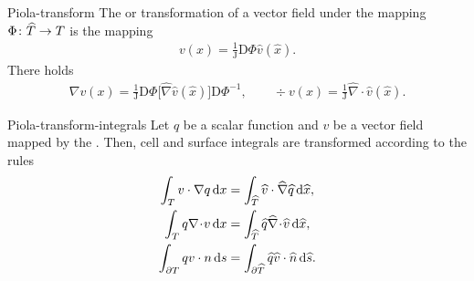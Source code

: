\begin{Definition}{Piola-transform}
  The  or 
    transformation of a vector field under the mapping
  $\Phi\colon\widehat {T}\to T$ is the mapping
  \begin{gather}
    v(x) = \tfrac1{\mathrm J} \mathrm D\Phi \widehat v(\widehat x).
  \end{gather}
  There holds
  \begin{gather}
    \nabla v(x) = \tfrac1{\mathrm J} \mathrm D\Phi
    \bigl[\widehat\nabla \widehat v(\widehat x)\bigr] \mathrm D\Phi^{-1},
    \qquad
    \div v(x) = \tfrac1{\mathrm J} \widehat\nabla\!\cdot\!
    \widehat v(\widehat x).
  \end{gather}
\end{Definition}

\begin{Lemma}{Piola-transform-integrals}
  Let $q$ be a scalar function and $v$ be a 
  vector field mapped by the . Then, cell
  and surface integrals are transformed according to the rules
  \begin{gather}
    \begin{split}
      \int_{T} v \cdot \nabla q \,\mathrm{d} x
      &= \int_{\widehat {T}} \widehat v \cdot \widehat \nabla \widehat q \,\mathrm{d} \widehat x,
      \\
      \int_{T} q \nabla\!\cdot\! v \,\mathrm{d} x
      &= \int_{\widehat {T}} \widehat q \widehat \nabla\!\cdot\! \widehat v \,\mathrm{d} \widehat x,
      \\
      \int_{\partial T} q v\cdot n \,\mathrm{d} s
      &= \int_{\partial\widehat {T}} \widehat q \widehat v\cdot\widehat {n} \,\mathrm{d} \widehat s.
    \end{split}
  \end{gather}
\end{Lemma}

